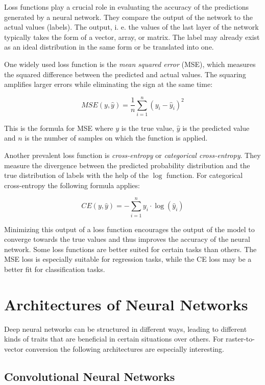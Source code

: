 \documentclass[12pt, a4paper, titlepage]{report}
\begin{document}
Loss functions play a crucial role in evaluating the accuracy of the predictions generated by a neural network. They compare the output of the network to the actual values (labels). The output, i. e. the values of the last layer of the network typically takes the form of a vector, array, or matrix. The label may already exist as an ideal distribution in the same form or be translated into one.


One widely used loss function is the \emph{mean squared error} (MSE), which measures the squared difference between the predicted and actual values. The squaring amplifies larger errors while eliminating the sign at the same time:

\[
   MSE(y, \hat{y}) = \frac{1}{n} \sum_{i=1}^{n} (y_i - \hat{y}_i)^2
\]

This is the formula for MSE where $y$ is the true value, $\hat{y}$ is the predicted value and $n$ is the number of samples on which the function is applied.


Another prevalent loss function is \emph{cross-entropy} or \emph{categorical cross-entropy}. They measure the divergence between the predicted probability distribution and the true distribution of labels with the help of the $\log$ function. For categorical cross-entropy the following formula applies:

\[
   CE(y, \hat{y}) = -\sum_{i=1}^{n} y_i \cdot \log(\hat{y}_i)
\]


Minimizing this output of a loss function encourages the output of the model to converge towards the true values and thus improves the accuracy of the neural network.
Some loss functions are better suited for certain tasks than others. The MSE loss is especially suitable for regression tasks, while the CE loss may be a better fit for classification tasks.


\section{Architectures of Neural Networks}

Deep neural networks can be structured in different ways, leading to different kinds of traits that are beneficial in certain situations over others. For raster-to-vector conversion the following architectures are especially interesting.


\subsection{Convolutional Neural Networks}
\end{document}
